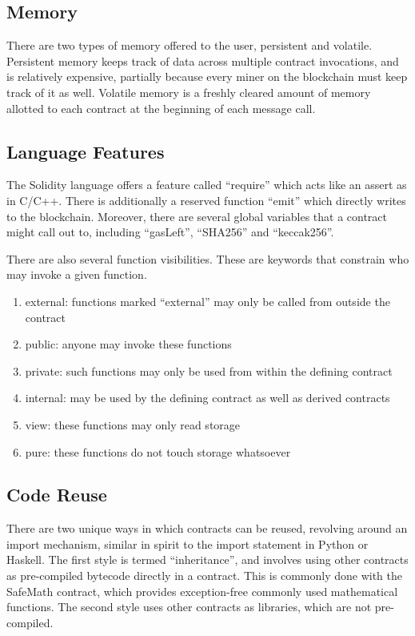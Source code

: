 \documentclass[twoside]{article}
\begin{document}
\subsection{Memory}

There are two types of memory offered to the user, persistent and volatile.
Persistent memory keeps track of data across multiple contract invocations, and
is relatively expensive, partially because every miner on the blockchain must
keep track of it as well.  Volatile memory is a freshly cleared amount of memory
allotted to each contract at the beginning of each message call.

\subsection{Language Features}

The Solidity language offers a feature called ``require'' which acts like an
assert as in C/C++.  There is additionally a reserved function ``emit'' which
directly writes to the blockchain.  Moreover, there are several global
variables that a contract might call out to, including ``gasLeft'',
``SHA256'' and ``keccak256''.

There are also several function visibilities.  These are keywords that constrain
who may invoke a given function.  

\begin{enumerate}
\item external: functions marked ``external'' may only be called from outside the contract
\item public: anyone may invoke these functions
\item private: such functions may only be used from within the defining contract
\item internal: may be used by the defining contract as well as derived contracts
\item view: these functions may only read storage
\item pure: these functions do not touch storage whatsoever
\end{enumerate}

\subsection{Code Reuse}

There are two unique ways in which contracts can be reused, revolving around an
import mechanism, similar in spirit to the import statement in Python or Haskell.
The first style is termed ``inheritance'', and involves using other contracts as
pre-compiled bytecode directly in a contract.  This is commonly done with the
SafeMath contract, which provides exception-free commonly used mathematical functions.
The second style uses other contracts as libraries, which are not pre-compiled.  
\end{document}
